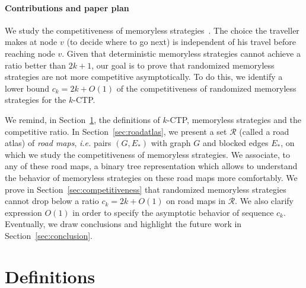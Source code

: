 \documentclass[preprint]{elsarticle}
\newcommand{\kctp}{$k$-CTP}
\begin{document}
\paragraph{Contributions and paper plan}
We study the competitiveness of memoryless strategies~\cite{Al03,BoEl98}. The choice the traveller makes at node $v$ (to decide where to go next) is independent of his travel before reaching node $v$. 
Given that deterministic memoryless strategies cannot achieve a ratio better than $2k+1$, our goal is to prove that randomized memoryless strategies are not more competitive asymptotically. To do this, we identify a lower bound $c_k = 2k + O\left(1\right)$ of the competitiveness of randomized memoryless strategies for the \kctp.

We remind, in Section~\ref{sec:def}, the definitions of \kctp , memoryless strategies and the competitive ratio.
In Section~\ref{sec:roadatlas}, we present a set $\mathcal{R}$ (called a road atlas) of \textit{road maps}, {\em i.e.} pairs $\left(G,E_*\right)$ with graph $G$ and blocked edges $E_*$, on which we study the competitiveness of memoryless strategies. We associate, to any of these road maps, a binary tree representation which allows to understand the behavior of memoryless strategies on these road maps more comfortably.
We prove in Section~\ref{sec:competitiveness} that randomized memoryless strategies cannot drop below a ratio $c_k = 2k+O\left(1\right)$ on road maps in $\mathcal{R}$. We also clarify expression $O\left(1\right)$ in order to specify the asymptotic behavior of sequence $c_k$.
Eventually, we draw conclusions and highlight the future work in Section~\ref{sec:conclusion}.
\section{Definitions} \label{sec:def}
\end{document}
